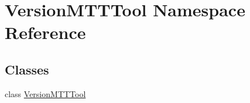 \hypertarget{namespaceVersionMTTTool}{\section{Version\-M\-T\-T\-Tool Namespace Reference}
\label{namespaceVersionMTTTool}
}
\subsection*{Classes}
\begin{DoxyCompactItemize}
\item 
class \hyperlink{classVersionMTTTool_1_1VersionMTTTool}{Version\-M\-T\-T\-Tool}
\end{DoxyCompactItemize}
